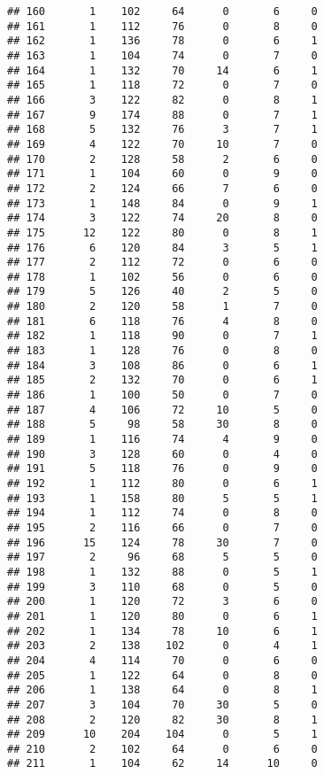 \documentclass[
]{article}
\begin{document}
\begin{verbatim}
## 160       1    102     64      0       6     0
## 161       1    112     76      0       8     0
## 162       1    136     78      0       6     1
## 163       1    104     74      0       7     0
## 164       1    132     70     14       6     1
## 165       1    118     72      0       7     0
## 166       3    122     82      0       8     1
## 167       9    174     88      0       7     1
## 168       5    132     76      3       7     1
## 169       4    122     70     10       7     0
## 170       2    128     58      2       6     0
## 171       1    104     60      0       9     0
## 172       2    124     66      7       6     0
## 173       1    148     84      0       9     1
## 174       3    122     74     20       8     0
## 175      12    122     80      0       8     1
## 176       6    120     84      3       5     1
## 177       2    112     72      0       6     0
## 178       1    102     56      0       6     0
## 179       5    126     40      2       5     0
## 180       2    120     58      1       7     0
## 181       6    118     76      4       8     0
## 182       1    118     90      0       7     1
## 183       1    128     76      0       8     0
## 184       3    108     86      0       6     1
## 185       2    132     70      0       6     1
## 186       1    100     50      0       7     0
## 187       4    106     72     10       5     0
## 188       5     98     58     30       8     0
## 189       1    116     74      4       9     0
## 190       3    128     60      0       4     0
## 191       5    118     76      0       9     0
## 192       1    112     80      0       6     1
## 193       1    158     80      5       5     1
## 194       1    112     74      0       8     0
## 195       2    116     66      0       7     0
## 196      15    124     78     30       7     0
## 197       2     96     68      5       5     0
## 198       1    132     88      0       5     1
## 199       3    110     68      0       5     0
## 200       1    120     72      3       6     0
## 201       1    120     80      0       6     1
## 202       1    134     78     10       6     1
## 203       2    138    102      0       4     1
## 204       4    114     70      0       6     0
## 205       1    122     64      0       8     0
## 206       1    138     64      0       8     1
## 207       3    104     70     30       5     0
## 208       2    120     82     30       8     1
## 209      10    204    104      0       5     1
## 210       2    102     64      0       6     0
## 211       1    104     62     14      10     0

\end{verbatim}
\end{document}
